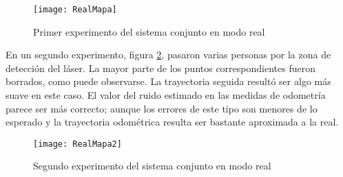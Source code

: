 \begin{figure}[h]
  \centering\texttt{[image: RealMapa]}\\
  \caption{ Primer experimento del sistema conjunto en modo real}\label{fg:RealMapa1}
\end{figure}

En un segundo experimento, figura \ref{fg:RealMapa2}, pasaron varias personas por la zona de detección del láser. La mayor parte de los puntos correspondientes fueron borrados, como puede observarse. La trayectoria seguida resultó ser algo más suave en este caso. El valor del ruido estimado en las medidas de odometría parece ser más correcto; aunque los errores de este tipo son menores de lo esperado y la trayectoria odométrica resulta ser bastante aproximada a la real.

\begin{figure}[h]
  \centering\texttt{[image: RealMapa2]}\\
  \caption{ Segundo experimento del sistema conjunto en modo real}\label{fg:RealMapa2}
\end{figure} 